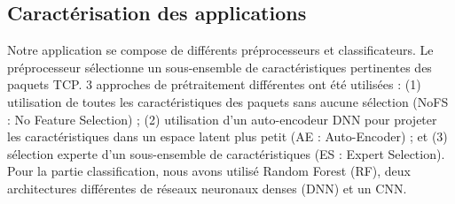 \subsection{Caractérisation des applications}
\label{section:herocache-characterization-workloads}

Notre application se compose de différents préprocesseurs et classificateurs. Le préprocesseur sélectionne un sous-ensemble de caractéristiques pertinentes des paquets TCP. 3 approches de prétraitement différentes ont été utilisées : (1) utilisation de toutes les caractéristiques des paquets sans aucune sélection (NoFS : No Feature Selection) ; (2) utilisation d'un auto-encodeur DNN pour projeter les caractéristiques dans un espace latent plus petit (AE : Auto-Encoder) ; et (3) sélection experte d'un sous-ensemble de caractéristiques (ES : Expert Selection). Pour la partie classification, nous avons utilisé Random Forest (RF), deux architectures différentes de réseaux neuronaux denses (DNN) et un CNN.

